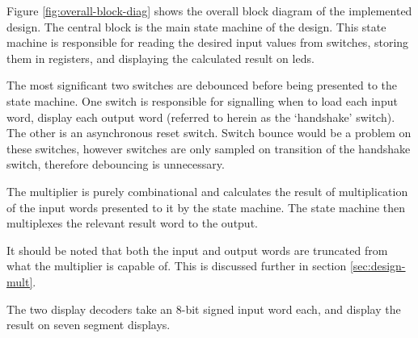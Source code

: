 Figure \ref{fig:overall-block-diag} shows the overall block diagram of the implemented design. The central block is the main state machine of the design. This state machine is responsible for reading the desired input values from switches, storing them in registers, and displaying the calculated result on \glspl{led}.

The most significant two switches are debounced before being presented to the state machine. One switch is responsible for signalling when to load each input word, display each output word (referred to herein as the `handshake' switch). The other is an asynchronous reset switch. Switch bounce would be a problem on these switches, however switches are only sampled on transition of the handshake switch, therefore debouncing is unnecessary.

The multiplier is purely combinational and calculates the result of multiplication of the input words presented to it by the state machine. The state machine then multiplexes the relevant result word to the output.

It should be noted that both the input and output words are truncated from what the multiplier is capable of. This is discussed further in section \ref{sec:design-mult}.

The two display decoders take an 8-bit signed input word each, and display the result on seven segment displays.



